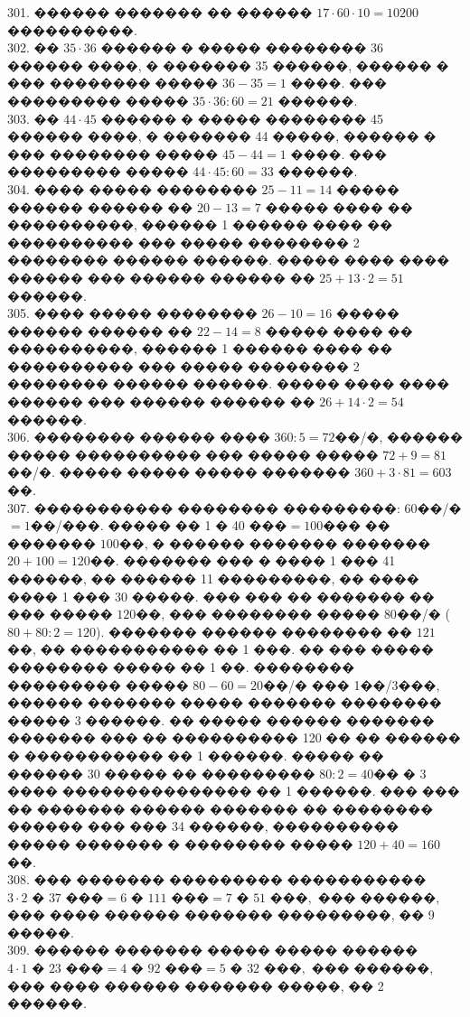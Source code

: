 \documentclass[12pt]{article}
\begin{document}
301. ������ ������� �� ������ $17\cdot60\cdot10=10200$ ����������.\\
302. �� $35\cdot36$ ������ � ����� �������� 36 ������ ����, � ������� 35 ������, ������ � ��� �������� ����� $36-35=1$ ����. ��� ��������� ����� $35\cdot36:60=21$ ������.\\
303. �� $44\cdot45$ ������ � ����� �������� 45 ������ ����, � ������� 44 �����, ������ � ��� �������� ����� $45-44=1$ ����. ��� ��������� ����� $44\cdot45:60=33$ ������.\\
304. ���� ����� �������� $25-11=14$ ����� ������ ������ �� $20-13=7$ ����� ���� �� ����������, ������ 1 ������ ���� �� ���������� ��� ����� �������� 2 �������� ������ ������. ����� ���� ���� ������ ��� ������ ������ �� $25+13\cdot2=51$ ������.\\
305. ���� ����� �������� $26-10=16$ ����� ������ ������ �� $22-14=8$ ����� ���� �� ����������, ������ 1 ������ ���� �� ���������� ��� ����� �������� 2 �������� ������ ������. ����� ���� ���� ������ ��� ������ ������ �� $26+14\cdot2=54$ ������.\\
306. �������� ������ ���� $360:5=72$��/�, ������ ����� ���������� ��� ����� ����� $72+9=81$��/�. ����� ����� ����� ������� $360+3\cdot81=603$��.\\
307. ����������� �������� ���������: 60��/�$=1$��/���. ����� �� 1 � 40 ���$=100$��� �� ������� $100$��, � ������ ������� ������� $20+100=120$��. ������� ��� � ���� 1 ��� 41 ������, �� ������ 11 ���������, �� ���� ���� 1 ��� 30 �����. ��� ��� �� ������� �� ��� ����� $120$��, ��� �������� ����� $80$��/� ($80+80:2=120$). ������� ������ �������� �� $121$��, �� ����������� �� 1 ���. �� ��� ����� �������� ����� �� 1 ��. �������� ��������� ����� $80-60=20$��/� ��� 1��/3���, ������ ������� ����� ������� �������� ����� 3 ������. �� ����� ������ ������� ������� ��� �� ���������� 120 �� �� ������ � ����������� �� 1 ������. ����� �� ������ 30 ����� �� ��������� $80:2=40$�� � 3 ���� ��������������� �� 1 ������. ��� ��� �� ������� ������ ������� �� �������� ������ ��� ��� 34 ������, ���������� ����� ������� � �������� �����
$120+40=160$��.\\
308. ��� ������� ��������� ����������� $3\cdot2\text{ � }37\text{ ���}=6\text{ � } 111\text{ ���}=7\text{ � }51\text{ ���},$ ��� ������, ��� ���� ������ ������� ���������, �� 9 �����.\\
309. ������ ������� ����� ����� ������ $4\cdot1\text{ � }23\text{ ���}=4\text{ � } 92\text{ ���}=5\text{ � }32\text{ ���},$ ��� ������, ��� ���� ������ ������� �����, �� 2 ������.\\
\end{document}
